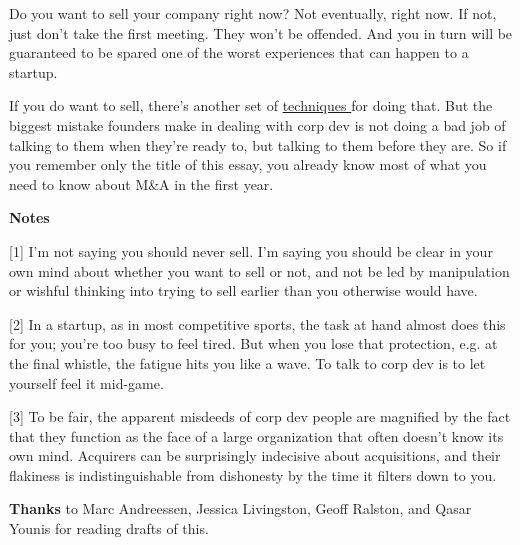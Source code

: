                   Do you want to sell your company right now? Not eventually,
                  right now. If not, just don't take the first meeting. They
                  won't be offended. And you in turn will be guaranteed to be
                  spared one of the worst experiences that can happen to a
                  startup.

If you do want to sell, there's another
                  set of
                  \href{https://justinkan.com/the-founders-guide-to-selling-your-company-a1b2025c9481}{techniques
                  }
                  for doing that. But the biggest mistake founders make in
                  dealing with corp dev is not doing a bad job of talking to
                  them when they're ready to, but talking to them before they
                  are. So if you remember only the title of this essay, you
                  already know most of what you need to know about M\&A in the
                  first year.









\textbf{Notes}

[1] I'm not saying you should never sell. I'm saying you should
                  be clear in your own mind about whether you want to sell or
                  not, and not be led by manipulation or wishful thinking into
                  trying to sell earlier than you otherwise would have.

[2] In a startup, as in most competitive sports, the task at
                  hand almost does this for you; you're too busy to feel tired.
                  But when you lose that protection, e.g. at the final whistle,
                  the fatigue hits you like a wave. To talk to corp dev is to
                  let yourself feel it mid-game.

[3] To be fair, the apparent misdeeds of corp dev people are
                  magnified by the fact that they function as the face of a
                  large organization that often doesn't know its own mind.
                  Acquirers can be surprisingly indecisive about acquisitions,
                  and their flakiness is indistinguishable from dishonesty by
                  the time it filters down to you.

\textbf{Thanks} to
                  Marc Andreessen, Jessica Livingston, Geoff Ralston, and Qasar
                  Younis for reading drafts of this.


              
            
          
            
              
                


                  
              
            
          
